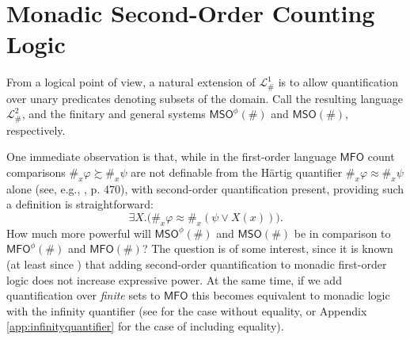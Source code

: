 \documentclass[12pt,oneside,reqno]{amsart}
\theoremstyle{definition}
\begin{document}







\section{Monadic Second-Order Counting Logic} \label{section:second-order} From a logical point of view, a natural extension of $\mathcal{L}_\#^1$ is to allow quantification over unary predicates denoting subsets of the domain.  Call the resulting language $\mathcal{L}_\#^2$, and the finitary and general systems $\mathsf{MSO}^\phi(\#)$ and $\mathsf{MSO}(\#)$, respectively. 

One immediate observation is that, while in the first-order language $\mathsf{MFO}$ count comparisons $\#_x \varphi \succsim \#_x \psi$ are not definable from the H\"{a}rtig quantifier $\#_x\varphi \approx \#_x\psi$ alone (see, e.g.,  \citealt{PetersWesterstahl}, p. 470), with second-order quantification present, providing such a definition is straightforward: \vspace{-0.5ex}
\begin{equation*}
    \exists X . \big(\#_x\varphi \approx \#_x(\psi \vee X(x))\big).
\end{equation*} How much more powerful will $\mathsf{MSO}^\phi(\#)$ and $\mathsf{MSO}(\#)$ be in comparison to $\mathsf{MFO}^\phi(\#)$ and $\mathsf{MFO}(\#)$? The question is of some interest, since it is known (at least since \citealt{Ackermann}) that adding second-order quantification to monadic first-order logic does not increase expressive power. At the same time, if we add quantification over \emph{finite} sets to $\mathsf{MFO}$ this becomes equivalent to monadic logic with the infinity quantifier (see \citealt{Vaananen} for the case without equality, or Appendix \ref{app:infinityquantifier} for the case of including equality).
\end{document}
